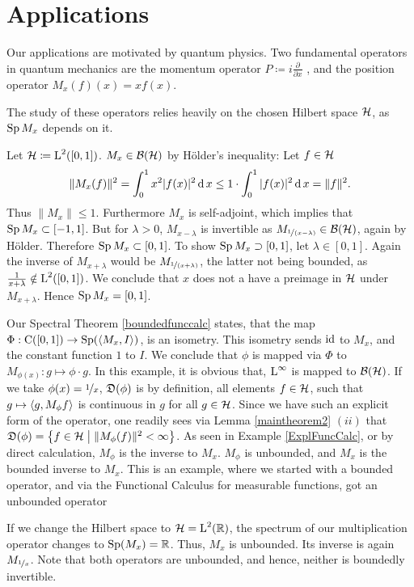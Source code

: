 \section{Applications}

Our applications are motivated by quantum physics. Two fundamental operators
in quantum mechanics are the momentum operator $P\coloneqq 
i \frac{\partial}{\partial x}$
, and the position operator $M_x(f)(x) = xf(x)$. 

\begin{rem}
The study of these operators relies heavily on the chosen Hilbert space $\mathcal{H}$, 
as $\operatorname{Sp} M_x$ depends on it.
\end{rem}
\begin{expl}\label{ExplMult}
 

Let $\mathcal{H} \coloneqq \text{L}^2(\left[ 0, 1 \right])$. $M_x \in \mathcal{B}(\mathcal{H})$ by Hölder's 
inequality: Let $f \in \mathcal{H}$
\[
 \| M_x(f) \|^2 = \int _0 ^1 x^2 | f(x)|^2 \operatorname{d} x \leq 
 1 \cdot \int _0 ^1 | f(x) |^2 \operatorname{d} x = \| f \| ^2.
\]
Thus $\| M_x\| \leq 1$. Furthermore $M_x$ is self-adjoint, which implies that
$\operatorname{Sp} M_x \subset \left[ -1 , 1 \right]$. But for $\lambda > 0$,
$M_{x-\lambda}$ is invertible as $M_{\nicefrac{1}{(x - \lambda)}} \in \mathcal{B}(\mathcal{H})$, again by
Hölder. Therefore $\operatorname{Sp} M_x \subset \left[ 0, 1\right]$. To show 
$\operatorname{Sp} M_x \supset \left[ 0, 1\right]$, let $\lambda \in  \left[ 0, 1\right]$.
Again the inverse of $M_{x+ \lambda}$ would be $M_{\nicefrac{1}{(x + \lambda)}}$,
the latter not being bounded, as $\frac{1}{x + \lambda} \notin 
\text{L}^2(\left[ 0, 1\right])$. We conclude that $x$ does not a have a preimage
in $\mathcal{H}$ under $M_{x + \lambda}$. Hence $\operatorname{Sp} M_x = \left[ 0 , 1\right]$.

Our Spectral Theorem \ref{boundedfunccalc} states, that the map
$\Phi : \operatorname{C}(\left[0, 1\right]) \to \operatorname{Sp} (\left\langle M_x, I \right\rangle)$, is an isometry. This 
isometry sends $\operatorname{id}$ to $M_x$, and the constant function $1$ to $I$.
We conclude that $\phi$ is mapped via $\Phi$ to 
$M_{\phi(x)}: g \mapsto \phi \cdot g$. In this example, it is obvious that,
$\text{L}^\infty$ is mapped to $\mathcal{B}(\mathcal{H})$. If we take $\phi(x) = \nicefrac{1}{x}$, 
$\mathfrak{D}(\phi)$ is by definition, all elements $f \in \mathcal{H}$, such that
$g \mapsto \left\langle g, M_\phi f \right\rangle$ is continuous in $g$ for all $g \in \mathcal{H}$.
Since we have such an explicit form of the operator, one readily sees via 
Lemma \ref{maintheorem2} $(ii)$ that
$\mathfrak{D}(\phi) = \left\lbrace f \in \mathcal{H} \bigm | \|M_\phi (f)\|^2 < \infty \right\rbrace$.
As seen in Example \ref{ExplFuncCalc}, or by direct calculation, 
$M_\phi$ is the inverse to $M_x$. $M_\phi$ is unbounded, and $M_x$ is 
the bounded inverse to $M_x$. This is an example, where we started with
a bounded operator, and via the Functional Calculus for measurable 
functions, got an unbounded operator

If we change the Hilbert space to $\mathcal{H} = \text{L}^2 (\mathbb{R})$, the spectrum
of our multiplication operator changes to $\operatorname{Sp}(M_x) = \mathbb{R}$. Thus, $M_x$ 
is unbounded. Its inverse is again $M_{\nicefrac{1}{x}}$. Note that 
both operators are unbounded, and hence, neither is boundedly invertible.
\end{expl}

